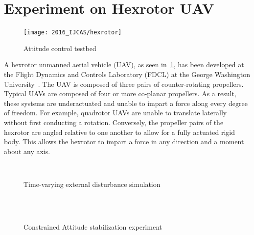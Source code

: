 \section{Experiment on Hexrotor UAV}\label{sec:experiment}

\begin{figure}[htbp]
    \centering
    \texttt{[image: 2016\_IJCAS/hexrotor]}
    \caption{Attitude control testbed~\label{fig:hexrotor}}
\end{figure}
\vspace{-3mm}
A hexrotor unmanned aerial vehicle (UAV), as seen in~\cref{fig:hexrotor}, has been developed at the Flight Dynamics and Controls Laboratory (FDCL) at the George Washington University~\cite{kaufman2014}.
The UAV is composed of three pairs of counter-rotating propellers. 
Typical UAVs are composed of four or more co-planar propellers.
As a result, these systems are underactuated and unable to impart a force along every degree of freedom.
For example, quadrotor UAVs are unable to translate laterally without first conducting a rotation.
Conversely, the propeller pairs of the hexrotor are angled relative to one another to allow for a fully actuated rigid body.
This allows the hexrotor to impart a force in any direction and a moment about any axis. 
\begin{figure}[htbp]
    \centering 
    ~
    ~
    \caption{Time-varying external disturbance simulation}
    \label{fig:tv} 
\end{figure}
\begin{figure}[t]
    \centering 
    ~
    ~
    \\
    ~
    \caption{Constrained Attitude stabilization experiment}
    \label{fig:exp} 
\end{figure}
